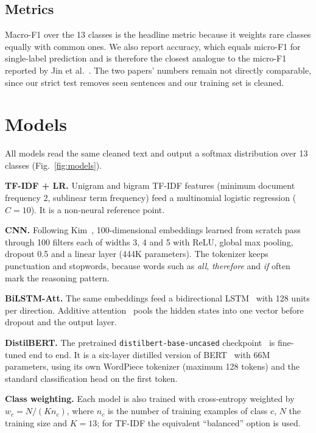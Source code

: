 \documentclass[conference]{IEEEtran}
\begin{document}
\subsection{Metrics}
Macro-F1 over the 13 classes is the headline metric because it weights rare classes equally with common ones. We also report accuracy, which equals micro-F1 for single-label prediction and is therefore the closest analogue to the micro-F1 reported by Jin et al.~\cite{jin2022logical}. The two papers' numbers remain not directly comparable, since our strict test removes seen sentences and our training set is cleaned.

\section{Models}
All models read the same cleaned text and output a softmax distribution over 13 classes (Fig.~\ref{fig:models}).

\textbf{TF-IDF + LR.} Unigram and bigram TF-IDF features (minimum document frequency 2, sublinear term frequency) feed a multinomial logistic regression ($C=10$). It is a non-neural reference point.

\textbf{CNN.} Following Kim~\cite{kim2014cnn}, 100-dimensional embeddings learned from scratch pass through 100 filters each of widths 3, 4 and 5 with ReLU, global max pooling, dropout 0.5 and a linear layer (444K parameters). The tokenizer keeps punctuation and stopwords, because words such as \emph{all}, \emph{therefore} and \emph{if} often mark the reasoning pattern.

\textbf{BiLSTM-Att.} The same embeddings feed a bidirectional LSTM~\cite{hochreiter1997lstm} with 128 units per direction. Additive attention~\cite{bahdanau2015attention} pools the hidden states into one vector before dropout and the output layer.

\textbf{DistilBERT.} The pretrained \texttt{distilbert-base-uncased} checkpoint~\cite{sanh2019distilbert} is fine-tuned end to end. It is a six-layer distilled version of BERT~\cite{devlin2019bert} with 66M parameters, using its own WordPiece tokenizer (maximum 128 tokens) and the standard classification head on the first token.

\textbf{Class weighting.} Each model is also trained with cross-entropy weighted by $w_c = N/(K n_c)$, where $n_c$ is the number of training examples of class $c$, $N$ the training size and $K=13$; for TF-IDF the equivalent ``balanced'' option is used.
\end{document}
